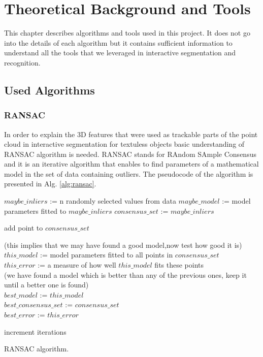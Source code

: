 \chapter{Theoretical Background and Tools}
\label{chapter:Background}
This chapter describes algorithms and tools used in this project. It does not go into the details of each algorithm but it contains sufficient information to understand all the tools that we leveraged in interactive segmentation and recognition.
\section{Used Algorithms}
\subsection{RANSAC}
In order to explain the 3D features that were used as trackable parts of the point cloud in interactive segmentation for textuless objects basic understanding of RANSAC algorithm is needed. RANSAC stands for RAndom SAmple Consensus and it is an iterative algorithm that enables to find parameters of a mathematical model in the set of data containing outliers. The pseudocode of the algorithm is presented in Alg. \ref{alg:ransac}. 

\begin{algorithm}[htb!]
{
$maybe\_inliers$ := n randomly selected values from data
$maybe\_model$ := model parameters fitted to $maybe\_inliers$
$consensus\_set$ := $maybe\_inliers$

{

{
add point to $consensus\_set$
}

}

{
(this implies that we may have found a good model,now test how good it is)\\
$this\_model$ := model parameters fitted to all points in $consensus\_set$\\
$this\_error$ := a measure of how well $this\_model$ fits these points\\



{            (we have found a model which is better than any of the previous ones,
            keep it until a better one is found)\\
            $best\_model$ := $this\_model$\\
            $best\_consensus\_set$ := $consensus\_set$\\
            $best\_error$ := $this\_error$\\
}


}
    increment iterations

}


\caption{RANSAC algorithm.}
  \label{alg:ransac}
\end{algorithm}

